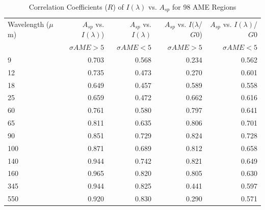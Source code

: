 \begin{table}[!htb]
\caption{Correlation Coefficients ($R$) of $I({\lambda})$ vs. $A_{sp}$ for 98 AME Regions} \label{IRvsAspTab}
\centering
\begin{tabular}{lrrrr}
\toprule
Wavelength ($\mu$m)	&$A_{sp}$ vs. $I({\lambda})$)	&$A_{sp}$ vs. $I({\lambda})$	&$A_{sp}$ vs. $I({\lambda}$/$G0$)	&$A_{sp}$ vs. $I({\lambda})$/$G0$ \\ 
    &$\sigma AME>5$  &$\sigma AME<5$ &$\sigma AME>5$  &$\sigma AME<5$      \\
\midrule
9	&0.703	&0.568	&0.234	&0.562 \\
12	&0.735	&0.473	&0.270	&0.601 \\
18	&0.649	&0.457	&0.589	&0.558 \\
25	&0.659	&0.472	&0.662	&0.616 \\
60	&0.761	&0.580	&0.797	&0.641 \\
65	&0.811	&0.635	&0.806	&0.701 \\
90	&0.851	&0.729	&0.824	&0.728 \\
100	&0.871	&0.689	&0.812	&0.658 \\
140	&0.944	&0.742	&0.821	&0.649 \\
160	&0.965	&0.820	&0.805	&0.630 \\
345	&0.944	&0.825	&0.441	&0.597 \\
550	&0.920	&0.830	&0.290	&0.571 \\
\bottomrule
\end{tabular}
\end{table}

